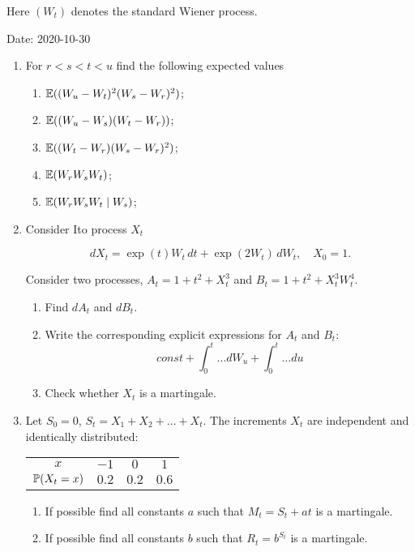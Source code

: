Here $(W_t)$ denotes the standard Wiener process.

Date: 2020-10-30

\begin{enumerate}
    
    
    
    \item For $r<s<t<u$ find the following expected values 
    \begin{enumerate}
    \item $\E((W_u - W_t)^2(W_s - W_r)^2)$;
    \item $\E((W_u - W_s)(W_t - W_r))$;
    \item $\E((W_t - W_r)(W_s - W_r)^2)$;
    \item $\E(W_r W_s W_t)$;
    \item $\E(W_r W_s W_t \mid W_s)$;
    \end{enumerate}

\item Consider Ito process $X_t$

\[
dX_t = \exp(t) W_t\, dt + \exp(2W_t) \, dW_t, \quad X_0 = 1.
\]

Consider two processes, $A_t = 1 + t^2 + X_t^3$ and $B_t = 1 + t^2 + X_t^3 W_t^4$.

\begin{enumerate}
    \item Find $dA_t$ and $dB_t$.
    \item Write the corresponding explicit expressions for $A_t$ and $B_t$:
    \[
    const + \int_0^t \ldots dW_u + \int_0^t \ldots du
    \]
    \item Check whether $X_t$ is a martingale.
\end{enumerate}

\item Let $S_0 = 0$, $S_t = X_1 + X_2 + \ldots + X_t$. The increments $X_t$ are independent and identically distributed: 

\begin{tabular}{cccc}
\toprule
$x$ & $-1$ & $0$ & $1$ \\
$\P(X_t = x)$ & $0.2$ & $0.2$ & $0.6$ \\
\bottomrule
\end{tabular}

\begin{enumerate}
    \item If possible find all constants $a$ such that $M_t = S_t + at$ is a martingale.
  \item If possible find all constants $b$ such that $R_t = b^{S_t}$ is a martingale.
\end{enumerate}


\end{enumerate}
